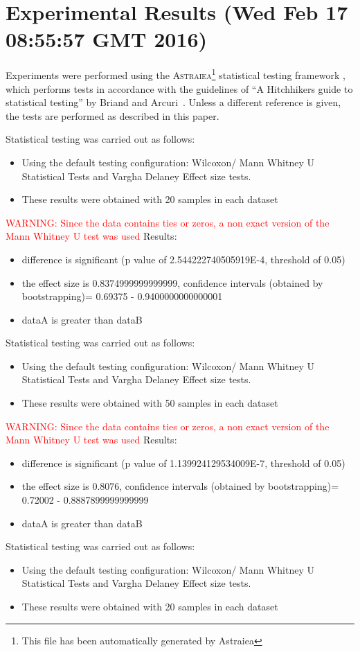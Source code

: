 \documentclass[]{article}
\begin{document}
\section{Experimental Results (Wed Feb 17 08:55:57 GMT 2016)}
Experiments were performed using the \textsc{Astraiea}\footnote{This file has been automatically generated by Astraiea} statistical testing framework \cite{Neumann:2014:EET:2598394.2609850},
which performs tests in accordance with the guidelines of ``A Hitchhikers guide to statistical testing''
by Briand and Arcuri~\cite{Arcuri2012}.
Unless a different reference is given, the tests are performed as described in this paper.

Statistical testing was carried out as follows: \begin{itemize}
\item{Using the default testing configuration: Wilcoxon/ Mann Whitney U Statistical Tests and Vargha Delaney Effect size tests.}
\item{These results were obtained with 20 samples in each dataset}
\end{itemize}
\textcolor{Red}{WARNING: Since the data contains ties or zeros, a non exact version of the Mann Whitney U test was used
}
Results:
\begin{itemize}
\item{difference is significant (p value of 2.544222740505919E-4, threshold of 0.05)}
\item{the effect size is 0.8374999999999999, confidence intervals (obtained by bootstrapping)= 0.69375 - 0.9400000000000001}
\item{dataA is greater than dataB}
\end{itemize}Statistical testing was carried out as follows: \begin{itemize}
\item{Using the default testing configuration: Wilcoxon/ Mann Whitney U Statistical Tests and Vargha Delaney Effect size tests.}
\item{These results were obtained with 50 samples in each dataset}
\end{itemize}
\textcolor{Red}{WARNING: Since the data contains ties or zeros, a non exact version of the Mann Whitney U test was used
}
Results:
\begin{itemize}
\item{difference is significant (p value of 1.139924129534009E-7, threshold of 0.05)}
\item{the effect size is 0.8076, confidence intervals (obtained by bootstrapping)= 0.72002 - 0.8887899999999999}
\item{dataA is greater than dataB}
\end{itemize}Statistical testing was carried out as follows: \begin{itemize}
\item{Using the default testing configuration: Wilcoxon/ Mann Whitney U Statistical Tests and Vargha Delaney Effect size tests.}
\item{These results were obtained with 20 samples in each dataset}
\end{itemize}
\end{document}
